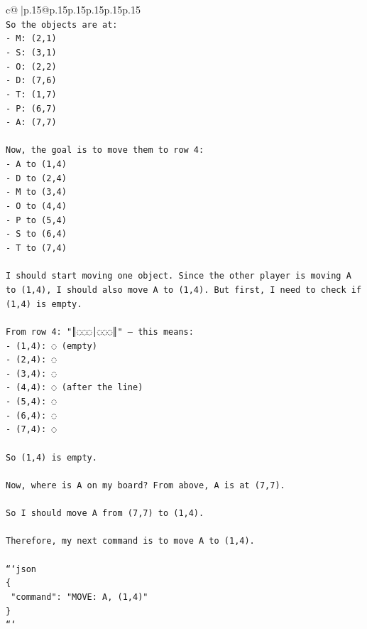 \documentclass{article}
\begin{document}
{\begin{supertabular}{c@{$\;$}|p{.15\linewidth}@{}p{.15\linewidth}p{.15\linewidth}p{.15\linewidth}p{.15\linewidth}p{.15\linewidth}}
{{{\\ 
\texttt{So the objects are at:} \\
\texttt{{-} M: (2,1)} \\
\texttt{{-} S: (3,1)} \\
\texttt{{-} O: (2,2)} \\
\texttt{{-} D: (7,6)} \\
\texttt{{-} T: (1,7)} \\
\texttt{{-} P: (6,7)} \\
\texttt{{-} A: (7,7)} \\
\\ 
\texttt{Now, the goal is to move them to row 4:} \\
\texttt{{-} A to (1,4)} \\
\texttt{{-} D to (2,4)} \\
\texttt{{-} M to (3,4)} \\
\texttt{{-} O to (4,4)} \\
\texttt{{-} P to (5,4)} \\
\texttt{{-} S to (6,4)} \\
\texttt{{-} T to (7,4)} \\
\\ 
\texttt{I should start moving one object. Since the other player is moving A to (1,4), I should also move A to (1,4). But first, I need to check if (1,4) is empty.} \\
\\ 
\texttt{From row 4: "║◌◌◌│◌◌◌║" — this means:} \\
\texttt{{-} (1,4): ◌ (empty)} \\
\texttt{{-} (2,4): ◌} \\
\texttt{{-} (3,4): ◌} \\
\texttt{{-} (4,4): ◌ (after the line)} \\
\texttt{{-} (5,4): ◌} \\
\texttt{{-} (6,4): ◌} \\
\texttt{{-} (7,4): ◌} \\
\\ 
\texttt{So (1,4) is empty.} \\
\\ 
\texttt{Now, where is A on my board? From above, A is at (7,7).} \\
\\ 
\texttt{So I should move A from (7,7) to (1,4).} \\
\\ 
\texttt{Therefore, my next command is to move A to (1,4).} \\
\\ 
\texttt{```json} \\
\texttt{\{} \\
\texttt{  "command": "MOVE: A, (1,4)"} \\
\texttt{\}} \\
\texttt{```} \\
            }
        }
    }
     \\ \\


\end{supertabular}}
\end{document}
